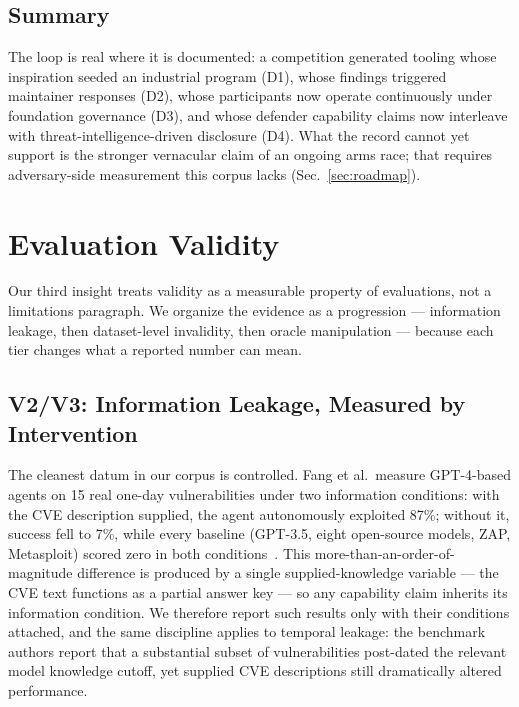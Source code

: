 \documentclass[conference,compsoc]{IEEEtran}
\begin{document}
\subsection{Summary}
The loop is real where it is documented: a competition generated tooling whose inspiration
seeded an industrial program (D1), whose findings triggered maintainer responses (D2), whose
participants now operate continuously under foundation governance (D3), and whose defender
capability claims now interleave with threat-intelligence-driven disclosure (D4). What the
record cannot yet support is the stronger vernacular claim of an ongoing arms race; that
requires adversary-side measurement this corpus lacks (Sec.~\ref{sec:roadmap}).

\section{Evaluation Validity}
\label{sec:validity}

Our third insight treats validity as a measurable property of evaluations, not a limitations
paragraph. We organize the evidence as a progression --- information leakage, then dataset-level
invalidity, then oracle manipulation --- because each tier changes what a reported number can
mean.

\subsection{V2/V3: Information Leakage, Measured by Intervention}
The cleanest datum in our corpus is controlled. Fang et al.\ measure GPT-4-based agents on 15
real one-day vulnerabilities under two information conditions: with the CVE description
supplied, the agent autonomously exploited 87\%; without it, success fell to 7\%, while every
baseline (GPT-3.5, eight open-source models, ZAP, Metasploit) scored zero in both
conditions~\cite{fang2024agents}. This more-than-an-order-of-magnitude difference is produced by a single
supplied-knowledge variable --- the CVE text functions as a partial answer key --- so any
capability claim inherits its information condition. We therefore report such results only with
their conditions attached, and the same discipline applies to temporal leakage: the benchmark
authors report that a substantial subset of vulnerabilities post-dated the relevant model
knowledge cutoff, yet supplied CVE descriptions still dramatically altered performance.
\end{document}

